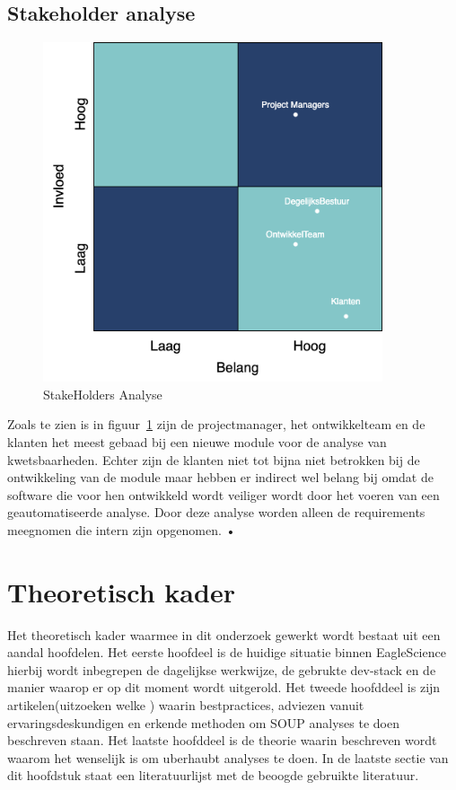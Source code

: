 \subsection{Stakeholder analyse}\label{subsec:stakeholder-analyse1}
\begin{figure}[H]
    \myfloatalign
    \includegraphics[width=10cm]{gfx/stakeholderanalyse}
    \caption{StakeHolders Analyse}
    \label{fig:StakeholderAnalyse1}
\end{figure}
Zoals te zien is in figuur~\ref{fig:StakeholderAnalyse1} zijn de projectmanager, het ontwikkelteam en de klanten het meest gebaad bij een nieuwe module voor de analyse van kwetsbaarheden.
Echter zijn de klanten niet tot bijna niet betrokken bij de ontwikkeling van de module maar hebben er indirect wel belang bij omdat de software die voor hen ontwikkeld wordt veiliger wordt door het voeren van een geautomatiseerde analyse.
Door deze analyse worden alleen de requirements meegnomen die intern zijn opgenomen.
•


\section{Theoretisch kader}\label{sec:theoretisch-kader}
Het theoretisch kader waarmee in dit onderzoek gewerkt wordt bestaat uit een aandal hoofdelen. Het eerste hoofdeel is de huidige situatie binnen EagleScience hierbij wordt inbegrepen de dagelijkse werkwijze, de gebrukte dev-stack en de manier waarop er op dit moment wordt uitgerold. Het tweede hoofddeel is zijn artikelen(uitzoeken welke ) waarin bestpractices, adviezen vanuit ervaringsdeskundigen en erkende methoden om SOUP analyses te doen beschreven staan. Het laatste hoofddeel is de theorie waarin beschreven wordt waarom het wenselijk is om uberhaubt analyses te doen. In de laatste sectie van dit hoofdstuk staat een literatuurlijst met de beoogde gebruikte literatuur.

